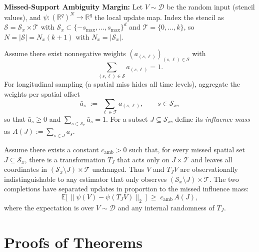 \begin{assumption}
\label{ass:influence}
\noindent\textbf{Missed-Support Ambiguity Margin:}
Let $V\sim\mathcal{D}$ be the random input (stencil values), and $\psi:(\mathbb{R}^{q})^{N}\to\mathbb{R}^{q}$ the local update map.
Index the stencil as $\mathcal{S}=\mathcal{S}_x\times\mathcal{T}$ with $\mathcal{S}_x\subset\{-s_{\max},\ldots,s_{\max}\}^d$ and $\mathcal{T}=\{0,\ldots,k\}$, so $N=|\mathcal{S}|=N_x(k{+}1)$ with $N_x=|\mathcal{S}_x|$.

Assume there exist nonnegative weights $(a_{(s,\ell)})_{(s,\ell)\in\mathcal{S}}$ with $$\sum_{(s,\ell)\in\mathcal{S}} a_{(s,\ell)}=1.$$ For longitudinal sampling (a spatial miss hides all time levels), aggregate the weights per spatial offset
\[
\bar a_s \;:=\; \sum_{\ell\in\mathcal{T}} a_{(s,\ell)}, \qquad s\in\mathcal{S}_x,
\]
so that $\bar a_s\ge 0$ and $\sum_{s\in\mathcal{S}_x}\bar a_s=1$. For a subset $J\subseteq\mathcal{S}_x$, define its \emph{influence mass} as $A(J):=\sum_{s\in J}\bar a_s$.

Assume there exists a constant $c_{\mathrm{amb}}>0$ such that, for every missed spatial set $J\subseteq\mathcal{S}_x$, there is a transformation $T_J$ that acts only on $J\times\mathcal{T}$ and leaves all coordinates in $(\mathcal{S}_x\setminus J)\times\mathcal{T}$ unchanged. Thus $V$ and $T_JV$ are observationally indistinguishable to any estimator that only observes $(\mathcal{S}_x\setminus J)\times\mathcal{T}$. The two completions have separated updates in proportion to the missed influence mass:
\begin{equation}
  \mathbb{E}\bigl[ \,\|\psi(V)-\psi(T_J V)\|_2 \,\bigr]
  \;\ge\;
  c_{\mathrm{amb}}\, A(J),
\label{eq:set_inf}
\end{equation}
where the expectation is over $V\sim\mathcal{D}$ and any internal randomness of $T_J$.
\end{assumption}

\section{Proofs of Theorems}
\label{sec:proofs}


